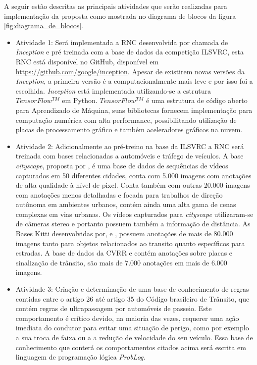 \documentclass[
	12pt,				%
    oneside,			%
	a4paper,			%
	english,			%
	french,				%
	spanish,			%
	brazil,				%
	]{abntex2}
\begin{document}
A seguir estão descritas as principais atividades que serão realizadas para implementação da proposta como mostrada no diagrama de blocos da figura \ref{fig:diagrama_de_blocos}. 


\begin{itemize}
   

 \item Atividade 1: Será implementada a RNC desenvolvida por  chamada de \textit{Inception} e pré treinada com a base de dados da competição ILSVRC, esta RNC está disponível no GitHub, disponível em \url{https://github.com/google/inception}. Apesar de existirem novas versões da \textit{Inception}, a primeira versão é a computacionalmente mais leve e por isso foi a escolhida. \textit{Inception} está implementada utilizando-se a estrutura $TensorFlow^{TM}$ em Python. $TensorFlow^{TM}$ é uma estrutura de código aberto para Aprendizado de Máquina, suas bibliotecas fornecem implementação para computação numérica com alta performance, possibilitando utilização de placas de processamento gráfico e também aceleradores gráficos na nuvem. 
 

 \item Atividade 2: Adicionalmente ao pré-treino na base da ILSVRC a RNC será treinada com bases relacionadas a automóveis e tráfego de veículos.\newline
 A base \textit{cityscape}, proposta por , é uma base de dados de sequências de vídeos capturados em 50 diferentes cidades, conta com 5.000 imagens com anotações de alta qualidade à nível de pixel. Conta também com outras 20.000 imagens com anotações menos detalhadas e focada para trabalhos de direção autônoma em ambientes urbanos, contém ainda uma alta gama de cenas complexas em vias urbanas. Os vídeos capturados para \textit{cityscape} utilizaram-se de câmeras stereo e portanto possuem também a informação de distância.\newline
 As Bases Kitti desenvolvidas por,  e , possuem anotações de mais de 80.000 imagens tanto para objetos relacionados ao transito quanto específicos para estradas.\newline
 A base de dados da CVRR  e  contém anotações sobre placas e sinalização de trânsito, são mais de 7.000 anotações em mais de 6.000 imagens.
 
 \item Atividade 3: Criação e determinação de uma base de conhecimento de regras contidas entre o artigo 26 até artigo 35 do Código brasileiro de Trânsito, que contém regras de ultrapassagem por automóveis de passeio. Este comportamento é crítico devido, na maioria das vezes, requerer uma ação imediata do condutor para evitar uma situação de perigo, como por exemplo a sua troca de faixa ou a a redução de velocidade do seu veículo. Essa base de conhecimento que conterá os comportamentos citados acima será escrita em linguagem de programação lógica \textit{ProbLog}. 
 

\end{itemize}
\end{document}

